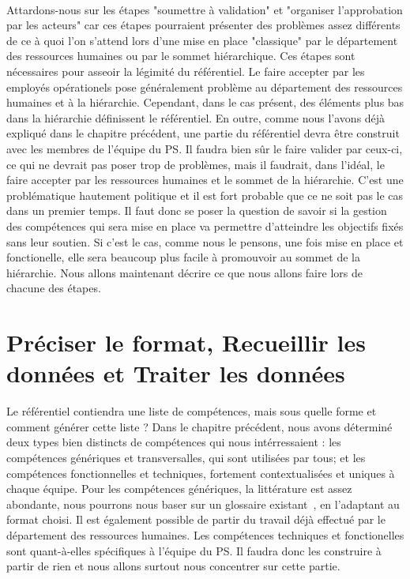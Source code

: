 \paragraph{} Attardons-nous sur les étapes "soumettre à validation" et "organiser l'approbation par les acteurs" car ces étapes pourraient présenter des problèmes assez différents de ce à quoi l'on s'attend lors d'une mise en place "classique" par le département des ressources humaines ou par le sommet hiérarchique. 
Ces étapes sont nécessaires pour asseoir la légimité du référentiel. Le faire accepter par les employés opérationels pose généralement problème au département des ressources humaines et à la hiérarchie. Cependant, dans le cas présent, des éléments plus bas dans la hiérarchie définissent le référentiel. En outre, comme nous l'avons déjà expliqué dans le chapitre précédent, une partie du référentiel devra être construit avec les membres de l'équipe du PS. Il faudra bien sûr le faire valider par ceux-ci, ce qui ne devrait pas poser trop de problèmes, mais il faudrait, dans l'idéal, le faire accepter par les ressources humaines et le sommet de la hiérarchie. C'est une problématique hautement politique et il est fort probable que ce ne soit pas le cas dans un premier temps. Il faut donc se poser la question de savoir si la gestion des compétences qui sera mise en place va permettre d'atteindre les objectifs fixés sans leur soutien. Si c'est le cas, comme nous le pensons, une fois mise en place et fonctionelle, elle sera beaucoup plus facile à promouvoir au sommet de la hiérarchie. Nous allons maintenant décrire ce que nous allons faire lors de chacune des étapes. 

\section{Préciser le format, Recueillir les données et Traiter les données}
Le référentiel contiendra une liste de compétences, mais sous quelle forme et comment générer cette liste ? Dans le chapitre précédent, nous avons déterminé deux types bien distincts de compétences qui nous intérressaient : les compétences génériques et transversalles, qui sont utilisées par tous; et les compétences fonctionnelles et techniques, fortement contextualisées et uniques à chaque équipe. Pour les compétences génériques, la littérature est assez abondante, nous pourrons nous baser sur un glossaire existant~\citep{exemple_ref}, en l'adaptant au format choisi. Il est également possible de partir du travail déjà effectué par le département des ressources humaines. Les compétences techniques et fonctionelles sont quant-à-elles spécifiques à l'équipe du PS. Il faudra donc les construire à partir de rien et nous allons surtout nous concentrer sur cette partie. 

